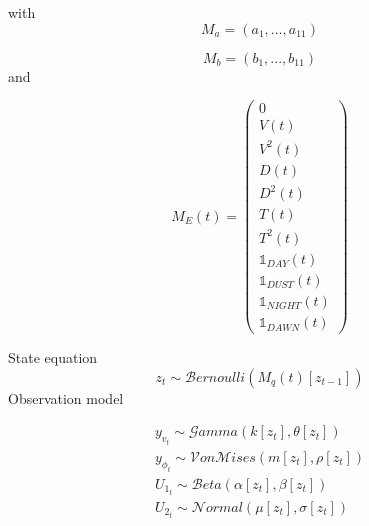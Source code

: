 \documentclass{article}
\begin{document}
\begin{linenumbers}
with
\begin{equation}
M_{a}=(a_{1}, ..., a_{11})
\end{equation}


\begin{equation}
M_{b}=(b_{1}, ..., b_{11})
\end{equation}
 and

\begin{equation}
M_{E}(t)=
\begin{pmatrix}
   0 \\
   V(t) \\
   V^2(t) \\
   D(t) \\
   D^2(t) \\
   T(t) \\
   T^2(t) \\
   \mathbb{1}_{DAY}(t) \\
   \mathbb{1}_{DUST}(t) \\
   \mathbb{1}_{NIGHT}(t) \\
   \mathbb{1}_{DAWN}(t)
\end{pmatrix}
\end{equation}


State equation 
\begin{equation}
z_{t} \sim \mathcal{B}ernoulli(M_{q}(t)[z_{t-1}]) 
\end{equation}
Observation model

\begin{equation}
\begin{array}{l}
y_{v_{t}} \sim \mathcal{G}amma(k[z_{t}], \theta[z_{t}])\\
y_{\phi_{t}} \sim \mathcal{V}on\mathcal{M}ises(m[z_{t}], \rho[z_{t}])\\
U_{1_{t}} \sim \mathcal{B}eta(\alpha[z_{t}], \beta[z_{t}])\\
U_{2_{t}} \sim \mathcal{N}ormal(\mu[z_{t}], \sigma[z_{t}])
\end{array}
\end{equation}


\end{linenumbers}
\end{document}
